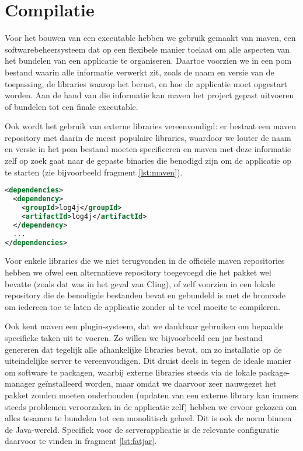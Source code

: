 \section{Compilatie}
\label{server:deployment:compilatie}

Voor het bouwen van een executable hebben we gebruik gemaakt van \ac{maven}, een softwarebeheersysteem dat op een flexibele manier toelaat om alle aspecten van het bundelen van een applicatie te organiseren. Daartoe voorzien we in een \ac{pom} bestand waarin alle informatie verwerkt zit, zoals de naam en versie van de toepassing, de libraries waarop het berust, en hoe de applicatie moet opgestart worden. Aan de hand van die informatie kan \ac{maven} het project gepast uitvoeren of bundelen tot een finale executable.

Ook wordt het gebruik van externe libraries vereenvoudigd: er bestaat een \ac{maven} repository met daarin de meest populaire libraries, waardoor we louter de naam en versie in het \ac{pom} bestand moeten specificeren en \ac{maven} met deze informatie zelf op zoek gaat naar de gepaste binaries die benodigd zijn om de applicatie op te starten (zie bijvoorbeeld fragment \ref{lst:maven}).

\begin{lstlisting}[language=XML, float, caption=Inladen van externe libraries via Maven., label=lst:maven]
<dependencies>
  <dependency>
    <groupId>log4j</groupId>
    <artifactId>log4j</artifactId>
  </dependency>
  ...
</dependencies>
\end{lstlisting}

Voor enkele libraries die we niet terugvonden in de officiële \ac{maven} repositories hebben we ofwel een alternatieve repository toegevoegd die het pakket wel bevatte (zoals dat was in het geval van Cling), of zelf voorzien in een lokale repository die de benodigde bestanden bevat en gebundeld is met de broncode om iedereen toe te laten de applicatie zonder al te veel moeite te compileren.

Ook kent \ac{maven} een plugin-systeem, dat we dankbaar gebruiken om bepaalde specifieke taken uit te voeren. Zo willen we bijvoorbeeld een \ac{jar} bestand genereren dat tegelijk alle afhankelijke libraries bevat, om zo installatie op de uiteindelijke server te vereenvoudigen. Dit druist deels in tegen de ideale manier om software te packagen, waarbij externe libraries steeds via de lokale package-manager geïnstalleerd worden, maar omdat we daarvoor zeer nauwgezet het pakket zouden moeten onderhouden (updaten van een externe library kan immers steeds problemen veroorzaken in de applicatie zelf) hebben we ervoor gekozen om alles tesamen te bundelen tot een monolitisch geheel. Dit is ook de norm binnen de Java-wereld. Specifiek voor de serverapplicatie is de relevante configuratie daarvoor te vinden in fragment \ref{lst:fatjar}.

